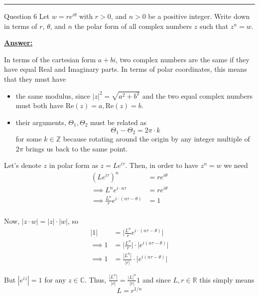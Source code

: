 \documentclass{article}
\newcommand{\R}{\mathbb{R}}
\newcommand{\C}{\mathbb{C}}
\begin{document}
\vskip 0.5cm
\hrule 
\vskip 0.5cm

\begin{mathdefinitionbox}{Question 6}
\vskip 0.5cm
Let $w = re^{i\theta}$ with $r > 0$, and $n > 0$ be a positive integer. Write down in terms of $r$, $\theta$, and $n$ the polar form of all complex numbers $z$ such that $z^{n} = w$.
\end{mathdefinitionbox}
  
\vskip 0.5cm
\underline{\textbf{Answer:}} 

In terms of the cartesian form $a + bi$, two complex numbers are the same if they have equal Real and Imaginary parts. In terms of polar coordinates, this means that they must have 
\begin{itemize}
  \item the same modulus, since $|z|^2 = \sqrt{a^2 + b^2}$ and the two equal complex numbers must both have $\text{Re}(z) = a, \text{Re}(z) = b$.
  \item their arguments, $\Theta_1, \Theta_2$ must be related as 
  \[ \Theta_1 - \Theta_2 = 2\pi \cdot k \]
  for some $k \in \mathbb{Z}$ because rotating around the origin by any integer multiple of $2\pi$ brings us back to the same point.
\end{itemize} 

\vskip 0.5cm
Let's denote $z$ in polar form as $z = Le^{i\tau}$. Then, in order to have $z^n = w$ we need 
\begin{align*}
  (Le^{i\tau})^n &= re^{i\theta} \\
  \implies L^ne^{i\cdot n\tau} &= re^{i\theta} \\
  \implies \frac{L^n}{r} e^{i \cdot \left( n\tau - \theta \right)} &= 1 \\
\end{align*}

Now, $|z \cdot w| = |z| \cdot |w|$, so 
\begin{align*}
  |1| &= \lvert \frac{L^n}{r} e^{i \cdot \left( n\tau - \theta \right)} \rvert \\
  \implies 1 &= \lvert \frac{L^n}{r} \rvert \cdot \lvert e^{i(n\tau - \theta)} \rvert \\
  \implies 1 &= \frac{|L^n|}{|r|}  \cdot \lvert e^{i(n\tau - \theta)} \rvert 
\end{align*}

But $|e^{iz}| = 1$ for any $z \in \C$. Thus, $\frac{|L^n|}{|r|} = \frac{|L|^n}{|r|} 1$ and since $L, r \in \R$ this simply means 
\[ \boxed{L = r^{1/n}} \]
\end{document}
